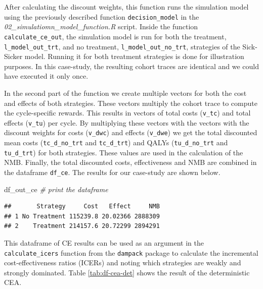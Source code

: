 \documentclass[]{book}
\newenvironment{Shaded}{\begin{snugshade}}{\end{snugshade}}
\newcommand{\KeywordTok}[1]{\textcolor[rgb]{0.13,0.29,0.53}{\textbf{#1}}}
\newcommand{\DataTypeTok}[1]{\textcolor[rgb]{0.13,0.29,0.53}{#1}}
\newcommand{\StringTok}[1]{\textcolor[rgb]{0.31,0.60,0.02}{#1}}
\newcommand{\CommentTok}[1]{\textcolor[rgb]{0.56,0.35,0.01}{\textit{#1}}}
\newcommand{\OperatorTok}[1]{\textcolor[rgb]{0.81,0.36,0.00}{\textbf{#1}}}
\newcommand{\NormalTok}[1]{#1}
\begin{document}
After calculating the discount weights, this function runs the
simulation model using the previously described function
\texttt{decision\_model} in the
\emph{02\_simulatiomn\_model\_function.R} script. Inside the function
\texttt{calculate\_ce\_out}, the simulation model is run for both the
treatment, \texttt{l\_model\_out\_trt}, and no treatment,
\texttt{l\_model\_out\_no\_trt}, strategies of the Sick-Sicker model.
Running it for both treatment strategies is done for illustration
purposes. In this case-study, the resulting cohort traces are identical
and we could have executed it only once.

In the second part of the function we create multiple vectors for both
the cost and effects of both strategies. These vectors multiply the
cohort trace to compute the cycle-specific rewards. This results in
vectors of total costs (\texttt{v\_tc}) and total effects
(\texttt{v\_tu}) per cycle. By multiplying these vectors with the
vectors with the discount weights for costs (\texttt{v\_dwc}) and
effects (\texttt{v\_dwe}) we get the total discounted mean costs
(\texttt{tc\_d\_no\_trt} and \texttt{tc\_d\_trt}) and QALYs
(\texttt{tu\_d\_no\_trt} and \texttt{tu\_d\_trt}) for both strategies.
These values are used in the calculation of the NMB. Finally, the total
discounted costs, effectiveness and NMB are combined in the dataframe
\texttt{df\_ce}. The results for our case-study are shown below.

\begin{Shaded}
\begin{Highlighting}[]
\NormalTok{df_out_ce }\CommentTok{# print the dataframe }
\end{Highlighting}
\end{Shaded}

\begin{verbatim}
##       Strategy     Cost   Effect     NMB
## 1 No Treatment 115239.8 20.02366 2888309
## 2    Treatment 214157.6 20.72299 2894291
\end{verbatim}

This dataframe of CE results can be used as an argument in the
\texttt{calculate\_icers} function from the \texttt{dampack} package to
calculate the incremental cost-effectiveness ratios (ICERs) and noting
which strategies are weakly and strongly dominated. Table
\ref{tab:df-cea-det} shows the result of the deterministic CEA.

\begin{Shaded}
\end{Shaded}
\end{document}
